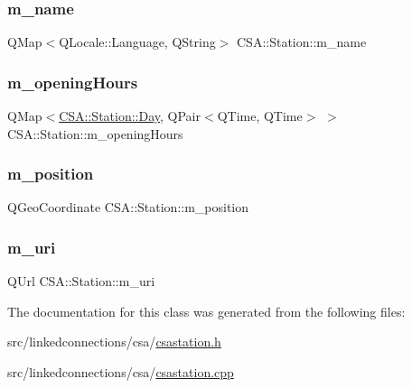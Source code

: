\subsubsection{\texorpdfstring{m\+\_\+name}{m\_name}}
{\footnotesize\ttfamily Q\+Map$<$Q\+Locale\+::\+Language, Q\+String$>$ C\+S\+A\+::\+Station\+::m\+\_\+name\hspace{0.3cm}{\ttfamily [private]}}

\mbox{\label{classCSA_1_1Station_ad822c4beb04f1b4739a4c17603e54bbb}} 
\subsubsection{\texorpdfstring{m\+\_\+opening\+Hours}{m\_openingHours}}
{\footnotesize\ttfamily Q\+Map$<$\mbox{\hyperlink{classCSA_1_1Station_aa160d0de40db0583099b5986dea1cd67}{C\+S\+A\+::\+Station\+::\+Day}}, Q\+Pair$<$Q\+Time, Q\+Time$>$ $>$ C\+S\+A\+::\+Station\+::m\+\_\+opening\+Hours\hspace{0.3cm}{\ttfamily [private]}}

\mbox{\label{classCSA_1_1Station_ae8f2de64fc98f099e23e0bf8cb117dc0}} 
\subsubsection{\texorpdfstring{m\+\_\+position}{m\_position}}
{\footnotesize\ttfamily Q\+Geo\+Coordinate C\+S\+A\+::\+Station\+::m\+\_\+position\hspace{0.3cm}{\ttfamily [private]}}

\mbox{\label{classCSA_1_1Station_a01e636d3257400f9748ed7060333990c}} 
\subsubsection{\texorpdfstring{m\+\_\+uri}{m\_uri}}
{\footnotesize\ttfamily Q\+Url C\+S\+A\+::\+Station\+::m\+\_\+uri\hspace{0.3cm}{\ttfamily [private]}}



The documentation for this class was generated from the following files\+:\begin{DoxyCompactItemize}
\item 
src/linkedconnections/csa/\mbox{\hyperlink{csastation_8h}{csastation.\+h}}\item 
src/linkedconnections/csa/\mbox{\hyperlink{csastation_8cpp}{csastation.\+cpp}}\end{DoxyCompactItemize}
